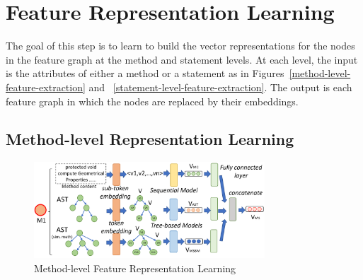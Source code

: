 \section{Feature Representation Learning}
\label{feature-learning:sec}

The goal of this step is to learn to build the vector representations
for the nodes in the feature graph at the method and statement levels.
At each level, the input is the attributes of either a method or a
statement as in Figures~\ref{method-level-feature-extraction} and
~\ref{statement-level-feature-extraction}. The output is each feature
graph in which the nodes are replaced by their embeddings.



\subsection{Method-level Representation Learning}

\begin{figure}[t]
	\centering
	\includegraphics[width=3.4in]{graphs/step-2-method-new.png}
	\caption{Method-level Feature Representation Learning}
	\label{method-level-feature-learning}
\end{figure}


